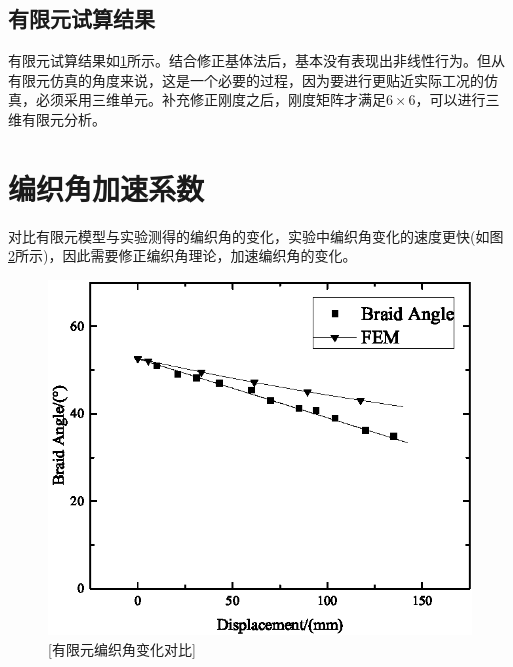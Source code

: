 \subsection{有限元试算结果}

有限元试算结果如\ref{fig:shisuan-1}所示。结合修正基体法后，基本没有表现出非线性行为。但从有限元仿真的角度来说，这是一个必要的过程，因为要进行更贴近实际工况的仿真，必须采用三维单元。补充修正刚度之后，刚度矩阵才满足$ 6\times6 $，可以进行三维有限元分析。
\begin{figure}[!htp]
\centering
{}
\label{fig:shisuan-1}
\end{figure}



\section{编织角加速系数}


对比有限元模型与实验测得的编织角的变化，实验中编织角变化的速度更快(如图 \ref{fig:Graph30}所示)，因此需要修正编织角理论，加速编织角的变化。
 
 \begin{figure}[!htp]
\centering
\includegraphics[width=0.5\linewidth]{figure/chap5/Graph30}
[有限元编织角变化对比]
\label{fig:Graph30}
\end{figure}

